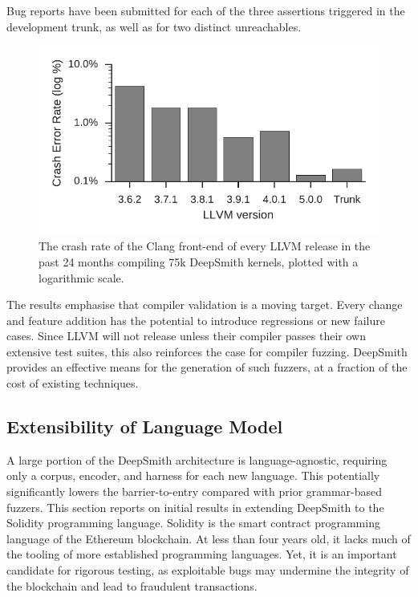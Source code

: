 \newpage
Bug reports have been submitted for each of the three assertions triggered in the development trunk, as well as for two distinct unreachables.

\begin{figure}
  \centering %
  \includegraphics[width=.85\columnwidth]{img/clang-crashes}%
  \caption[Crash rate of the Clang front-end]{%
    The crash rate of the Clang front-end of every LLVM release in the past 24 months compiling 75k DeepSmith kernels, plotted with a logarithmic scale.%
  }%
  \label{fig:clang-clash-rate}
\end{figure}

\begin{table}
  \centering %
  
  \caption[Number of DeepSmith programs which trigger errors]{%
    The number of DeepSmith programs which trigger distinct Clang front-end assertions, and the number of programs which trigger unreachables.%
  }
  \label{tab:clang-crash-rate}
\end{table}

The results emphasise that compiler validation is a moving target. Every change and feature addition has the potential to introduce regressions or new failure cases. Since LLVM will not release unless their compiler passes their own extensive test suites, this also reinforces the case for compiler fuzzing. DeepSmith provides an effective means for the generation of such fuzzers, at a fraction of the cost of existing techniques.


\subsection{Extensibility of Language Model}
\label{subsec:deepsmith-solidity-extensibility}



A large portion of the DeepSmith architecture is language-agnostic, requiring only a corpus, encoder, and harness for each new language. This potentially significantly lowers the barrier-to-entry compared with prior grammar-based fuzzers. This section reports on initial results in extending DeepSmith to the Solidity programming language. Solidity is the smart contract programming language of the Ethereum blockchain. At less than four years old, it lacks much of the tooling of more established programming languages. Yet, it is an important candidate for rigorous testing, as exploitable bugs may undermine the integrity of the blockchain and lead to fraudulent transactions.


